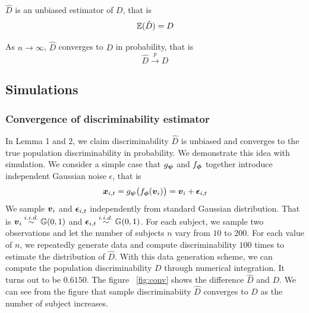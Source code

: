 \documentclass{article}
\begin{document}
\begin{lem}	
	$\hat{D}$ is an unbiased estimator of $D$, that is
	\[ \mathbb{E}(\hat{D}) = D\]
\end{lem}

\begin{lem}	
	As $n \rightarrow \infty$, $\hat{D}$ converges to $D$ in probability, that is
	\[\hat{D} \overset{p}{\rightarrow} D \]
\end{lem}



\subsection{Simulations}
\subsubsection{Convergence of discriminability estimator}
In Lemma 1 and 2, we claim discriminability $\hat{D}$ is unbiased and converges to  the true population discriminability in probability. We demonstrate this idea with simulation. We consider a simple case that $g_{\boldsymbol{\psi}}$ and $f_{\boldsymbol{\phi}}$ together introduce independent Gaussian noise $\epsilon$, that is
\begin{equation}
\boldsymbol{x}_{i,t} =g_{\boldsymbol{\psi}} \big(f_{\boldsymbol{\phi}} (\boldsymbol{v}_i) \big) =\boldsymbol{v}_{i} + \boldsymbol{\epsilon}_{i,t}
\end{equation}  
We sample $\boldsymbol{v}_{i}$ and $\boldsymbol{\epsilon}_{i,t}$ independently from standard Gaussian distribution. That is $\boldsymbol{v}_i \overset{i.i.d.}{\sim} \mathbb{G}(0,1)$ and $\boldsymbol{\epsilon}_{i,t} \overset{i.i.d.}{\sim} \mathbb{G}(0,1)$. For each  subject, we sample two observations and let the number of subjects $n$ vary from $10$ to $200$. For each value of $n$, we repeatedly generate data and compute discriminability $100$ times to estimate the distribution of $\hat{D}$. With this data generation scheme, we can compute the population discriminability $D$ through numerical integration. It turns out to be $0.6150$. The figure ~\ref{fig:conv} shows the difference $\hat{D}$ and $D$. We can see from the figure that sample discriminabiity $\hat{D}$ converges to $D$ as the number of subject increases.
\end{document}
